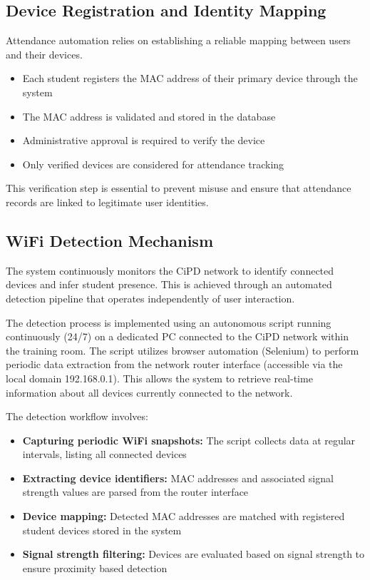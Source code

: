 \subsection{Device Registration and Identity Mapping}

Attendance automation relies on establishing a reliable mapping between users and their devices.

\begin{itemize}
    \item Each student registers the MAC address of their primary device through the system
    \item The MAC address is validated and stored in the database
    \item Administrative approval is required to verify the device
    \item Only verified devices are considered for attendance tracking
\end{itemize}

This verification step is essential to prevent misuse and ensure that attendance records are linked to
legitimate user identities.

\subsection{WiFi Detection Mechanism}

The system continuously monitors the CiPD network to identify connected devices and infer student
presence. This is achieved through an automated detection pipeline that operates independently of
user interaction.

The detection process is implemented using an autonomous script running continuously (24/7) on a
dedicated PC connected to the CiPD network within the training room. The script utilizes browser
automation (Selenium) to perform periodic data extraction from the network router interface
(accessible via the local domain 192.168.0.1). This allows the system to retrieve real-time
information about all devices currently connected to the network.

The detection workflow involves:

\begin{itemize}
    \item \textbf{Capturing periodic WiFi snapshots:} The script collects data at regular intervals, listing all
    connected devices
    \item \textbf{Extracting device identifiers:} MAC addresses and associated signal strength values are
    parsed from the router interface
    \item \textbf{Device mapping:} Detected MAC addresses are matched with registered student devices
    stored in the system
    \item \textbf{Signal strength filtering:} Devices are evaluated based on signal strength to ensure proximity
    based detection
\end{itemize}

